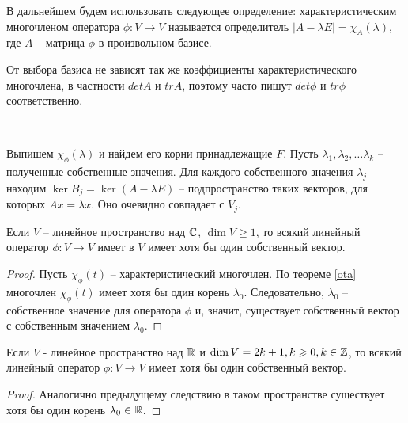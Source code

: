 \begin{definition}
    В дальнейшем будем использовать следующее определение: характеристическим многочленом оператора 
    $\phi: V \to V$ называется определитель $|A - \lambda E| = \chi_A(\lambda)$,
    где $A$ -- матрица $\phi$ в произвольном базисе.
\end{definition}

\begin{corollary}
    От выбора базиса не зависят так же коэффициенты характеристического многочлена, в частности 
    $det A$ и $tr A$, поэтому часто пишут $det \phi$ и $tr \phi$ соответственно.
\end{corollary}


\begin{algorithm}~

    Выпишем $\chi_{\phi}(\lambda)$ и найдем его корни принадлежащие $F$.
    Пусть $\lambda_1, \lambda_2,  \dots \lambda_k$ -- полученные собственные значения.
    Для каждого собственного значения $\lambda_j$ находим $\ker B_j = \ker (A - \lambda E)$ -- 
    подпространство таких векторов, для которых $Ax = \lambda x$. Оно очевидно совпадает с $V_j$.
\end{algorithm}

\begin{corollary}
    Если $V$ -- линейное пространство над $\mathbb{C}$, $\dim V \geq 1$, то всякий линейный оператор $\phi: V \to V$ имеет в $V$ имеет хотя бы один собственный вектор.
\end{corollary}

\begin{proof}
    Пусть $\chi_{\phi}(t)$ -- характеристический многочлен. По теореме \ref{ota} многочлен $\chi_{\phi}(t)$ 
    имеет хотя бы один корень $\lambda_0$. Следовательно, $\lambda_0$ -- 
    собственное значение для оператора $\phi$ и, значит, существует собственный вектор с собственным 
    значением $\lambda_0$.
\end{proof}

\begin{corollary}
    Если $V$ - линейное пространство над $\mathbb{R}$ и $\dim V = 2k + 1, k \geqslant 0, k \in \mathbb{Z}$, то всякий линейный оператор $\phi: V \to V$ имеет хотя бы один собственный вектор. 
\end{corollary}

\begin{proof}
    Аналогично предыдущему следствию в таком пространстве существует хотя бы один корень $\lambda_0 \in \mathbb{R}$.
\end{proof}
